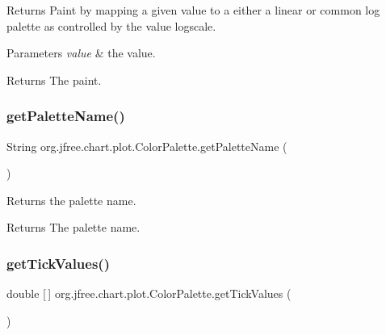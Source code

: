 Returns Paint by mapping a given value to a either a linear or common log palette as controlled by the value logscale.


\begin{DoxyParams}{Parameters}
{\em value} & the value.\\
\hline
\end{DoxyParams}
\begin{DoxyReturn}{Returns}
The paint. 
\end{DoxyReturn}
\mbox{\label{classorg_1_1jfree_1_1chart_1_1plot_1_1_color_palette_aca84890abf082714dc821ac9d094bd34}} 
\subsubsection{\texorpdfstring{get\+Palette\+Name()}{getPaletteName()}}
{\footnotesize\ttfamily String org.\+jfree.\+chart.\+plot.\+Color\+Palette.\+get\+Palette\+Name (\begin{DoxyParamCaption}{ }\end{DoxyParamCaption})}

Returns the palette name.

\begin{DoxyReturn}{Returns}
The palette name. 
\end{DoxyReturn}
\mbox{\label{classorg_1_1jfree_1_1chart_1_1plot_1_1_color_palette_aa8c19edc94fc1d0d1dd0c40081e52eb1}} 
\subsubsection{\texorpdfstring{get\+Tick\+Values()}{getTickValues()}}
{\footnotesize\ttfamily double \mbox{[}$\,$\mbox{]} org.\+jfree.\+chart.\+plot.\+Color\+Palette.\+get\+Tick\+Values (\begin{DoxyParamCaption}{ }\end{DoxyParamCaption})}

